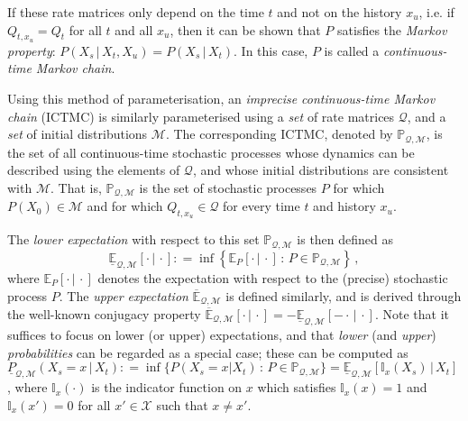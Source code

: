 \documentclass[twoside,11pt]{article}
\newcommand{\states}{\mathcal{X}}
\newcommand{\lexp}{\underline{\mathbb{E}}_{\rateset,\mathcal{M}}}
\newcommand{\uexp}{\overline{\mathbb{E}}_{\rateset,\mathcal{M}}}
\newcommand{\ind}[1]{\mathbb{I}_{#1}}
\newcommand{\rateset}{\mathcal{Q}}
\newcommand{\coloneqq}{:\!=}
\begin{document}
If these rate matrices only depend on the time $t$ and not on the history $x_u$, i.e. if $Q_{t,x_u}=Q_t$ for all $t$ and all $x_u$, then it can be shown that $P$ satisfies the \emph{Markov property}: $P(X_s\,\vert\,X_t,X_u)=P(X_s\,\vert\,X_t)$. In this case, $P$ is called a \emph{continuous-time Markov chain}.

Using this method of parameterisation, an \emph{imprecise continuous-time Markov chain} (ICTMC) is similarly parameterised using a \emph{set} of rate matrices $\rateset$, and a \emph{set} of initial distributions $\mathcal{M}$. The corresponding ICTMC, denoted by $\mathbb{P}_{\rateset,\mathcal{M}}$, is the set of all continuous-time stochastic processes whose dynamics can be described using the elements of $\rateset$, and whose initial distributions are consistent with $\mathcal{M}$. That is, $\mathbb{P}_{\rateset,\mathcal{M}}$ is the set of stochastic processes $P$ for which $P(X_0)\in\mathcal{M}$ and for which $Q_{t,x_u}\in\rateset$ for every time $t$ and history $x_u$.

The \emph{lower expectation} with respect to this set $\mathbb{P}_{\rateset,\mathcal{M}}$ is then defined as
\begin{equation*}
\underline{\mathbb{E}}_{\rateset,\mathcal{M}}[\cdot\,\vert\,\cdot] \coloneqq \inf\left\{ \mathbb{E}_P[\cdot\,\vert\,\cdot]\,:\, P\in\mathbb{P}_{\rateset,\mathcal{M}} \right\}\,,
\end{equation*}
where $\mathbb{E}_P[\cdot\,\vert\,\cdot]$ denotes the expectation with respect to the (precise) stochastic process $P$. The \emph{upper expectation} $\uexp$ is defined similarly, and is derived through the well-known conjugacy property $\uexp[\cdot\,\vert\,\cdot] = -\lexp[-\cdot\,\vert\,\cdot]$. Note that it suffices to focus on lower (or upper) expectations, and that \emph{lower} (and \emph{upper}) \emph{probabilities} can be regarded as a special case; these can be computed as $\underline{P}_{\rateset,\mathcal{M}}(X_s=x\,\vert\,X_t) \coloneqq \inf\{P(X_s=x\vert X_t)\,:\,P\in\mathbb{P}_{\rateset,\mathcal{M}}\} = \lexp[\ind{x}(X_s)\,\vert\,X_t]$, where $\ind{x}(\cdot)$ is the indicator function on $x$ which satisfies $\ind{x}(x)=1$ and $\ind{x}(x')=0$ for all $x'\in\states$ such that $x\neq x'$.
\end{document}
